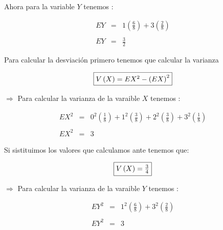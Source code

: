\documentclass[12pt]{article}
\begin{document}
\begin{flushleft}
    Ahora para la variable $Y$ tenemos :
\end{flushleft}

\begin{equation*}
    \begin{array}{rcl}
        EY & = & \displaystyle 1 \left(\frac{6}{8}\right) + 3 \left(\frac{2}{8}\right)
        \\
        \\
        EY & = & \displaystyle \frac{3}{2}
    \end{array}
\end{equation*}

\begin{flushleft}
    Para calcular la desviaci\'on primero tenemos que calcular la varianza
\end{flushleft}

\begin{equation*}
    \fbox{$V\left(X\right) = EX^2 - \left(EX\right)^2
        $}
\end{equation*}

\begin{flushleft}
    $\Rightarrow$ Para calcular la varianza de la varaible $X$ tenemos :
\end{flushleft}

\begin{equation*}
    \begin{array}{rcl}
        EX^2 & = & \displaystyle 0^2 \left(\frac{1}{8}\right) + 1^2 \left(\frac{3}{8}\right) + 2^2 \left(\frac{3}{8}\right) + 3^2 \left(\frac{1}{8}\right)
        \\
        \\
        EX^2 & = & 3
    \end{array}
\end{equation*}

\begin{flushleft}
    Si sistituimos los valores que calculamos ante tenemos que:
\end{flushleft}

\begin{equation*}
    \fbox{$V\left(X\right) = \frac{3}{4}$}
\end{equation*}

\begin{flushleft}
    $\Rightarrow$ Para calcular la varianza de la varaible $Y$ tenemos :
\end{flushleft}

\begin{equation*}
    \begin{array}{rcl}
        EY^2 & = & \displaystyle 1^2 \left(\frac{6}{8}\right) + 3^2 \left(\frac{2}{8}\right)
        \\
        \\
        EY^2 & = & 3
    \end{array}
\end{equation*}
\end{document}
